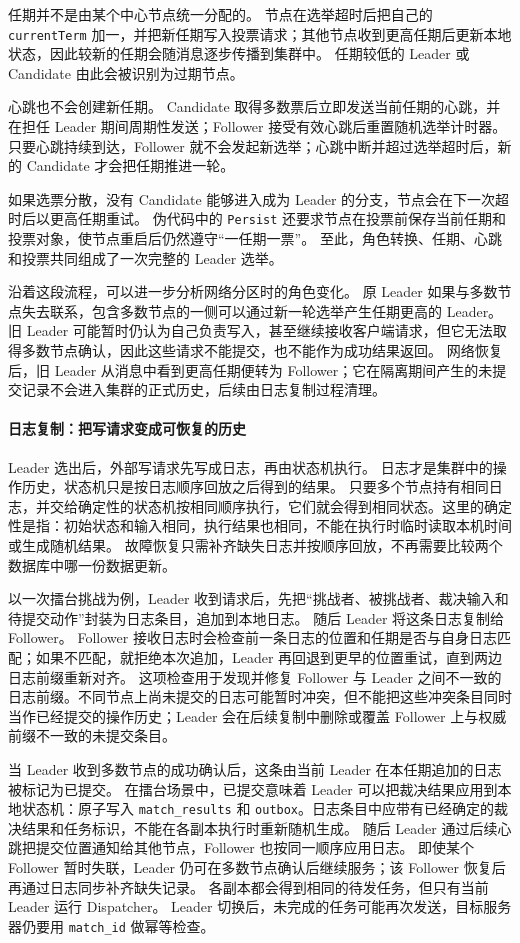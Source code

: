 任期并不是由某个中心节点统一分配的。
节点在选举超时后把自己的 \texttt{currentTerm} 加一，并把新任期写入投票请求；其他节点收到更高任期后更新本地状态，因此较新的任期会随消息逐步传播到集群中。
任期较低的 Leader 或 Candidate 由此会被识别为过期节点。

心跳也不会创建新任期。
Candidate 取得多数票后立即发送当前任期的心跳，并在担任 Leader 期间周期性发送；Follower 接受有效心跳后重置随机选举计时器。
只要心跳持续到达，Follower 就不会发起新选举；心跳中断并超过选举超时后，新的 Candidate 才会把任期推进一轮。

如果选票分散，没有 Candidate 能够进入成为 Leader 的分支，节点会在下一次超时后以更高任期重试。
伪代码中的 \texttt{Persist} 还要求节点在投票前保存当前任期和投票对象，使节点重启后仍然遵守“一任期一票”。
至此，角色转换、任期、心跳和投票共同组成了一次完整的 Leader 选举。

沿着这段流程，可以进一步分析网络分区时的角色变化。
原 Leader 如果与多数节点失去联系，包含多数节点的一侧可以通过新一轮选举产生任期更高的 Leader。
旧 Leader 可能暂时仍认为自己负责写入，甚至继续接收客户端请求，但它无法取得多数节点确认，因此这些请求不能提交，也不能作为成功结果返回。
网络恢复后，旧 Leader 从消息中看到更高任期便转为 Follower；它在隔离期间产生的未提交记录不会进入集群的正式历史，后续由日志复制过程清理。

\paragraph{日志复制：把写请求变成可恢复的历史}

Leader 选出后，外部写请求先写成日志，再由状态机执行。
日志才是集群中的操作历史，状态机只是按日志顺序回放之后得到的结果。
只要多个节点持有相同日志，并交给确定性的状态机按相同顺序执行，它们就会得到相同状态。这里的确定性是指：初始状态和输入相同，执行结果也相同，不能在执行时临时读取本机时间或生成随机结果。
故障恢复只需补齐缺失日志并按顺序回放，不再需要比较两个数据库中哪一份数据更新。

以一次擂台挑战为例，Leader 收到请求后，先把“挑战者、被挑战者、裁决输入和待提交动作”封装为日志条目，追加到本地日志。
随后 Leader 将这条日志复制给 Follower。
Follower 接收日志时会检查前一条日志的位置和任期是否与自身日志匹配；如果不匹配，就拒绝本次追加，Leader 再回退到更早的位置重试，直到两边日志前缀重新对齐。
这项检查用于发现并修复 Follower 与 Leader 之间不一致的日志前缀。不同节点上尚未提交的日志可能暂时冲突，但不能把这些冲突条目同时当作已经提交的操作历史；Leader 会在后续复制中删除或覆盖 Follower 上与权威前缀不一致的未提交条目。

当 Leader 收到多数节点的成功确认后，这条由当前 Leader 在本任期追加的日志被标记为已提交。
在擂台场景中，已提交意味着 Leader 可以把裁决结果应用到本地状态机：原子写入 \texttt{match\_results} 和 \texttt{outbox}。日志条目中应带有已经确定的裁决结果和任务标识，不能在各副本执行时重新随机生成。
随后 Leader 通过后续心跳把提交位置通知给其他节点，Follower 也按同一顺序应用日志。
即使某个 Follower 暂时失联，Leader 仍可在多数节点确认后继续服务；该 Follower 恢复后再通过日志同步补齐缺失记录。
各副本都会得到相同的待发任务，但只有当前 Leader 运行 Dispatcher。
Leader 切换后，未完成的任务可能再次发送，目标服务器仍要用 \texttt{match\_id} 做幂等检查。

